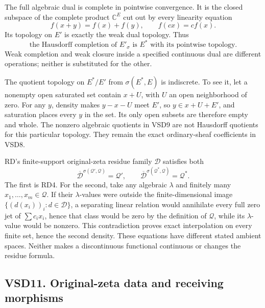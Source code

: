 The full algebraic dual is complete in pointwise convergence. It is the
closed subspace of the complete product \(\mathbb C^E\) cut out by every
linearity equation \[
f(x+y)=f(x)+f(y),\qquad f(cx)=cf(x).
\tag{VSD10.2}
\] Its topology on \(E'\) is exactly the weak dual topology. Thus \[
\boxed{\text{the Hausdorff completion of }E'_\sigma
\text{ is }E^*\text{ with its pointwise topology}.}
\tag{VSD10.3}
\] Weak completion and weak closure inside a specified continuous dual
are different operations; neither is substituted for the other.

The quotient topology on \(E^*/E'\) from \(\sigma(E^*,E)\) is
indiscrete. To see it, let a nonempty open saturated set contain
\(x+U\), with \(U\) an open neighborhood of zero. For any \(y\), density
makes \(y-x-U\) meet \(E'\), so \(y\in x+U+E'\), and saturation places
every \(y\) in the set. Its only open subsets are therefore empty and
whole. The nonzero algebraic quotients in VSD9 are not Hausdorff
quotients for this particular topology. They remain the exact
ordinary-sheaf coefficients in VSD8.

RD's finite-support original-zeta residue family \(\mathcal D\)
satisfies both \[
\overline{\mathcal D}^{\sigma(\mathcal Q',\mathcal Q)}=\mathcal Q',
\qquad
\overline{\mathcal D}^{\sigma(\mathcal Q^*,\mathcal Q)}=\mathcal Q^* .
\tag{VSD10.4}
\] The first is RD4. For the second, take any algebraic \(\lambda\) and
finitely many \(x_1,\ldots,x_m\in\mathcal Q\). If their
\(\lambda\)-values were outside the finite-dimensional image
\(\{(d(x_i))_i:d\in\mathcal D\}\), a separating linear relation would
annihilate every full zero jet of \(\sum c_ix_i\), hence that class
would be zero by the definition of \(\mathcal Q\), while its
\(\lambda\)-value would be nonzero. This contradiction proves exact
interpolation on every finite set, hence the second density. These
equations have different stated ambient spaces. Neither makes a
discontinuous functional continuous or changes the residue formula.

\subsection{VSD11. Original-zeta data and receiving
morphisms}\label{vsd11.-original-zeta-data-and-receiving-morphisms}

